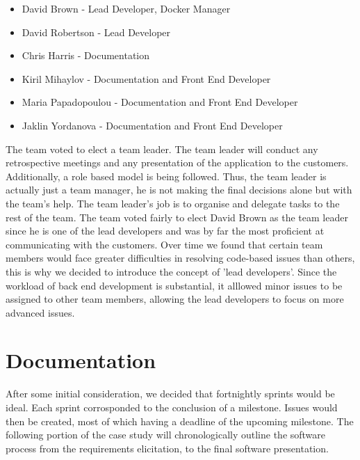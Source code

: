 \documentclass{l3proj}
\begin{document}
\begin{itemize}

\item David Brown - Lead Developer, Docker Manager

\item David Robertson - Lead Developer

\item Chris Harris - Documentation

\item Kiril Mihaylov - Documentation and Front End Developer

\item Maria Papadopoulou - Documentation and Front End Developer

\item Jaklin Yordanova - Documentation and Front End Developer

\end{itemize}
The team voted to elect a team leader. The team leader will conduct any retrospective meetings and any presentation of the application to the customers. Additionally, a role based model is being followed. Thus, the team leader is actually just a team manager, he is not making the final decisions alone but with the team's help. The team leader's job is to organise and delegate tasks to the rest of the team. The team voted fairly to elect David Brown as the team leader since he is one of the lead developers and was by far the most proficient at communicating with the customers. Over time we found that certain team members would face greater difficulties in resolving code-based issues than others, this is why we decided to introduce the concept of 'lead developers'. Since the workload of back end development is substantial, it alllowed minor issues to be assigned to other team members, allowing the lead developers to focus on more advanced issues.


\section{Documentation}
\label{documentation}

After some initial consideration, we decided that fortnightly sprints would be ideal. Each sprint corrosponded to the conclusion of a milestone. Issues would then be created, most of which having a deadline of the upcoming milestone. The following portion of the case study will chronologically outline the software process from the requirements elicitation, to the final software presentation.
\end{document}
